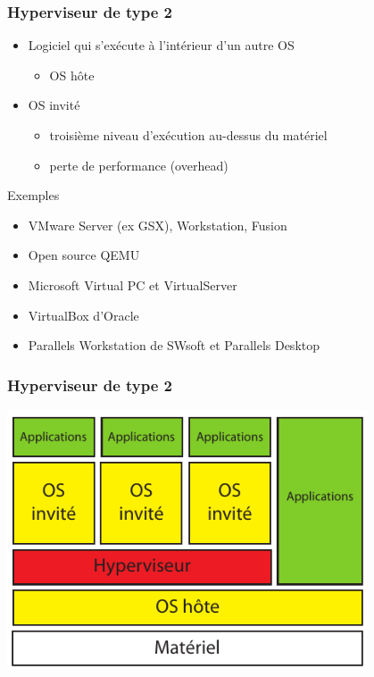 \begin{frame}
\frametitle{Hyperviseur de type 2}
  \begin{itemize}
	  \item Logiciel qui s'exécute à l'intérieur d'un autre OS
	  \begin{itemize}
		    \item OS hôte
	  \end{itemize}
	  \item OS invité
	  \begin{itemize}
		  \item troisième niveau d'exécution au-dessus du matériel
		  \item perte de performance (overhead)
	  \end{itemize}
  \end{itemize}

\begin{exampleblock}{Exemples}
  \begin{itemize}
  \item VMware Server (ex GSX), Workstation, Fusion
  \item Open source QEMU
  \item Microsoft Virtual PC et VirtualServer
  \item VirtualBox d'Oracle
  \item Parallels Workstation de SWsoft et Parallels Desktop
\end{itemize}
\end{exampleblock}
\end{frame}


\begin{frame}
\frametitle{Hyperviseur de type 2}
\includegraphics[width=0.8\textwidth]{../illustration/hyperviseur_invit.pdf}
\end{frame}

